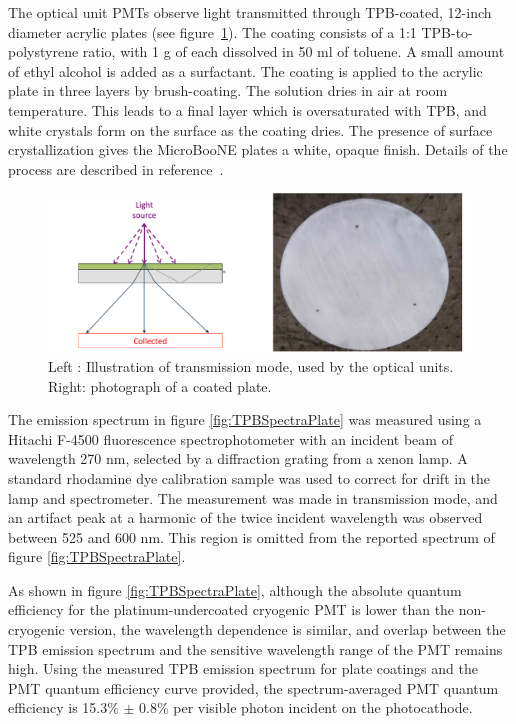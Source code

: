 The optical unit PMTs observe light transmitted through TPB-coated, 12-inch diameter acrylic plates (see figure~\ref{fig:PlateCoating}).
The coating consists of a 1:1 TPB-to-polystyrene ratio, with 1 g of each dissolved in 50 ml of toluene.  A small amount of ethyl alcohol is added as a surfactant.
The coating is applied to the acrylic plate in three layers by brush-coating.  The solution dries in air at room temperature.
This leads to a final layer which is oversaturated with TPB, and white crystals form on the surface as the coating dries.  The presence of surface crystallization gives the MicroBooNE plates a white, opaque finish. Details of the process are described in reference~\cite{Ignarra:2014yqa}.

\begin{figure}[t]
\centering 
\includegraphics[width=\textwidth]{./light_figures/PlateModeAndPhoto.pdf}
\caption{Left : Illustration of transmission mode, used by the optical units. Right: photograph of a coated plate. \label{fig:PlateCoating}}
\end{figure}

The emission spectrum in figure \ref{fig:TPBSpectraPlate} was measured using a Hitachi F-4500 fluorescence spectrophotometer with an incident beam of wavelength 270 nm, selected by a diffraction grating from a xenon lamp.  A standard rhodamine dye calibration sample was used to correct for drift in the lamp and spectrometer.  The measurement was made in transmission mode, and an artifact peak at a harmonic of the twice incident wavelength was observed between 525 and 600 nm.  This region is omitted from the reported spectrum of figure \ref{fig:TPBSpectraPlate}.  

As shown in figure \ref{fig:TPBSpectraPlate}, although the absolute quantum efficiency for the platinum-undercoated cryogenic PMT is lower than the non-cryogenic version, the wavelength dependence is similar, and overlap between the TPB emission spectrum and the sensitive wavelength range of the PMT remains high.  Using the measured TPB emission spectrum for plate coatings and the PMT quantum efficiency curve provided, the spectrum-averaged PMT quantum efficiency is 15.3\% $\pm$ 0.8\% per visible photon incident on the photocathode. 

